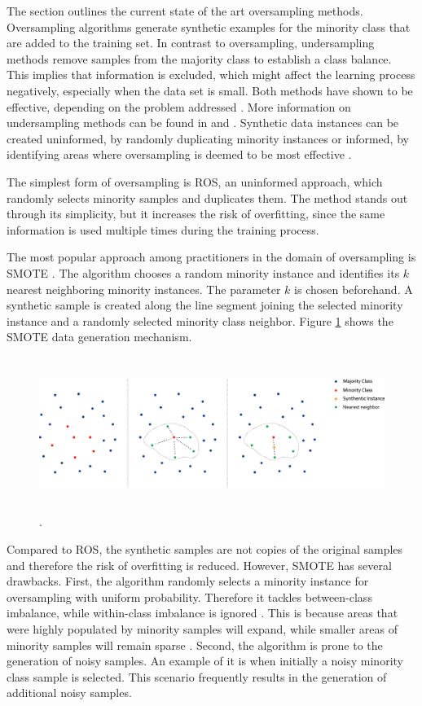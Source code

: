 \documentclass[parskip=full]{scrartcl}
\begin{document}
The section outlines the current state of the art oversampling methods. Oversampling algorithms generate synthetic examples for the minority class that are added to the training set. In contrast to oversampling, undersampling methods remove samples from the majority class to establish a class balance. This implies that information is excluded, which might affect the learning process negatively, especially when the data set is small. Both methods have shown to be effective, depending on the problem addressed \cite{Chawla2002}. More information on undersampling methods can be found in \cite{Ganganwar2012} and \cite{Yen2006}. Synthetic data instances can be created uninformed, by randomly duplicating minority instances or informed, by identifying areas where oversampling is deemed to be most effective \cite{Douzas2018a}.

The simplest form of oversampling is ROS, an uninformed approach, which randomly selects minority samples and duplicates them. The method stands out through its simplicity, but it increases the risk of overfitting, since the same information is used multiple times during the training process.

The most popular approach among practitioners in the domain of oversampling is SMOTE \cite{Chawla2002}. The algorithm chooses a random minority instance and identifies its $ k $ nearest neighboring minority instances. The parameter $ k $ is chosen beforehand. A synthetic sample is created along the line segment joining the selected minority instance and a randomly selected minority class neighbor. Figure \ref{fig:Schubach} shows the SMOTE data generation mechanism.

\begin{figure}[H]
	\centering
	\includegraphics[width=16.5cm, height=5cm, keepaspectratio]{../../analysis/gsomo/fig1.png}
	.
	\label{fig:Schubach}
\end{figure}

Compared to ROS, the synthetic samples are not copies of the original samples and therefore the risk of overfitting is reduced. However, SMOTE has several drawbacks. First, the algorithm randomly selects a minority instance for oversampling with uniform probability. Therefore it tackles between-class imbalance, while within-class imbalance is ignored \cite{Nekooeimehr2016}. This is because areas that were highly populated by minority samples will expand, while smaller areas of minority samples will remain sparse \cite{Prati2004}. Second, the algorithm is prone to the generation of noisy samples. An example of it is when initially a noisy minority class sample is selected. This scenario frequently results in the generation of additional noisy samples.
\end{document}
